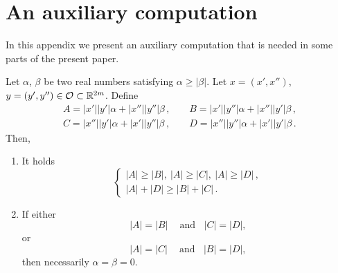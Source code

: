 \section{An auxiliary computation}
\label{Sec:AuxiliaryResults2}
In this appendix we present an auxiliary computation that is needed in some parts of the present
paper.

\begin{lemma}
\label{Lemma:ComputationABCD} Let $\alpha$, $\beta$ be two real numbers satisfying $\alpha \geq
|\beta|$. Let $x=(x',x'')$, $y=(y',y'')\in \mathcal{O} \subset \mathbb{R}^{2m}$. Define
$$
\begin{array}{cc}
	A = |x'||y'|  \alpha + |x''||y''|\beta \,, \ \ \ \ \ &
	B = |x'||y''| \alpha + |x''||y'| \beta \,, \\
	C = |x''||y'| \alpha + |x'||y''| \beta \,, \ \ \ \ \ &
	D = |x''||y''|\alpha + |x'||y'|  \beta \,.
\end{array}
$$
Then,
\begin{enumerate}
\item It holds
$$
\begin{cases}
|A| \geq |B|,\ |A| \geq|C|, \ |A| \geq|D|\,, \\
|A| + |D| \geq |B| + |C|\,.
\end{cases}
$$
\item If either
$$ |A| = |B| \ \ \ \ \textrm{ and} \ \ \ \ |C| = |D|, $$
or
$$ |A| = |C| \ \ \ \ \textrm{ and} \ \ \ \ |B| = |D|, $$
then necessarily $\alpha = \beta = 0$.
\end{enumerate}

\end{lemma}

